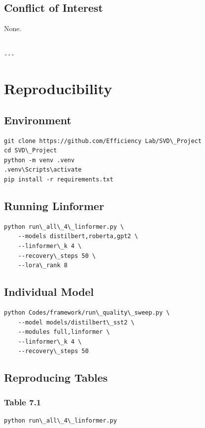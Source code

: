 \subsection{Conflict of Interest}

None.
\begin{lstlisting}

---
\end{lstlisting}

\section{Reproducibility}

\subsection{Environment}

\begin{lstlisting}
git clone https://github.com/Efficiency Lab/SVD\_Project
cd SVD\_Project
python -m venv .venv
.venv\Scripts\activate
pip install -r requirements.txt
\end{lstlisting}

\subsection{Running Linformer}

\begin{lstlisting}
python run\_all\_4\_linformer.py \
    --models distilbert,roberta,gpt2 \
    --linformer\_k 4 \
    --recovery\_steps 50 \
    --lora\_rank 8
\end{lstlisting}

\subsection{Individual Model}

\begin{lstlisting}
python Codes/framework/run\_quality\_sweep.py \
    --model models/distilbert\_sst2 \
    --modules full,linformer \
    --linformer\_k 4 \
    --recovery\_steps 50
\end{lstlisting}

\subsection{Reproducing Tables}

\subsubsection{Table 7.1}
\begin{lstlisting}
python run\_all\_4\_linformer.py
\end{lstlisting}

